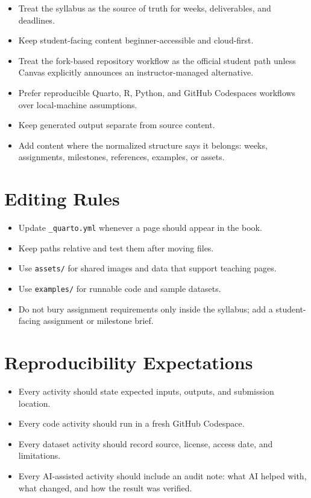 \documentclass[
  letterpaper,
  DIV=11,
  numbers=noendperiod,
  oneside]{scrreprt}
\providecommand{\tightlist}{%
  \setlength{\itemsep}{0pt}\setlength{\parskip}{0pt}}
\begin{document}
\begin{itemize}
\tightlist
\item
  Treat the syllabus as the source of truth for weeks, deliverables, and
  deadlines.
\item
  Keep student-facing content beginner-accessible and cloud-first.
\item
  Treat the fork-based repository workflow as the official student path
  unless Canvas explicitly announces an instructor-managed alternative.
\item
  Prefer reproducible Quarto, R, Python, and GitHub Codespaces workflows
  over local-machine assumptions.
\item
  Keep generated output separate from source content.
\item
  Add content where the normalized structure says it belongs: weeks,
  assignments, milestones, references, examples, or assets.
\end{itemize}

\section*{Editing Rules}\label{editing-rules}


\begin{itemize}
\tightlist
\item
  Update \texttt{\_quarto.yml} whenever a page should appear in the
  book.
\item
  Keep paths relative and test them after moving files.
\item
  Use \texttt{assets/} for shared images and data that support teaching
  pages.
\item
  Use \texttt{examples/} for runnable code and sample datasets.
\item
  Do not bury assignment requirements only inside the syllabus; add a
  student-facing assignment or milestone brief.
\end{itemize}

\section*{Reproducibility
Expectations}\label{reproducibility-expectations}


\begin{itemize}
\tightlist
\item
  Every activity should state expected inputs, outputs, and submission
  location.
\item
  Every code activity should run in a fresh GitHub Codespace.
\item
  Every dataset activity should record source, license, access date, and
  limitations.
\item
  Every AI-assisted activity should include an audit note: what AI
  helped with, what changed, and how the result was verified.
\end{itemize}
\end{document}
